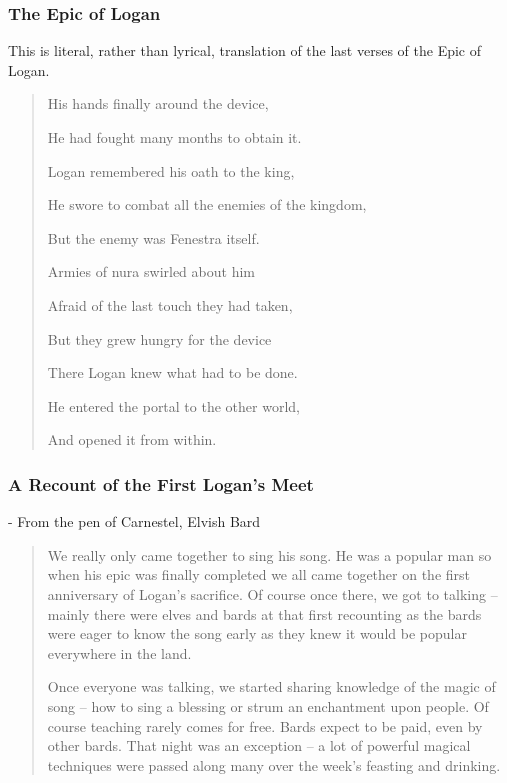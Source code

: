 \begin{multicols}{2}
\subsubsection{The Epic of Logan}

This is literal, rather than lyrical, translation of the last verses of the Epic of Logan.

\begin{verse}

	His hands finally around the device,

	He had fought many months to obtain it.

	Logan remembered his oath to the king,

	He swore to combat all the enemies of the kingdom,

	But the enemy was Fenestra itself.

	Armies of nura swirled about him

	Afraid of the last touch they had taken,

	But they grew hungry for the device

	There Logan knew what had to be done.

	He entered the portal to the other world,

	And opened it from within.

	\end{verse}

\subsubsection{A Recount of the First Logan's Meet}

- From the pen of Carnestel, Elvish Bard


\begin{quotation}
	We really only came together to sing his song.
	He was a popular man so when his epic was finally completed we all came together on the first anniversary of Logan's sacrifice.
	Of course once there, we got to talking -- mainly there were elves and bards at that first recounting as the bards were eager to know the song early as they knew it would be popular everywhere in the land.

	Once everyone was talking, we started sharing knowledge of the magic of song -- how to sing a blessing or strum an enchantment upon people.
	Of course teaching rarely comes for free.
	Bards expect to be paid, even by other bards.
	That night was an exception -- a lot of powerful magical techniques were passed along many over the week's feasting and drinking.


\end{quotation}
\end{multicols}
